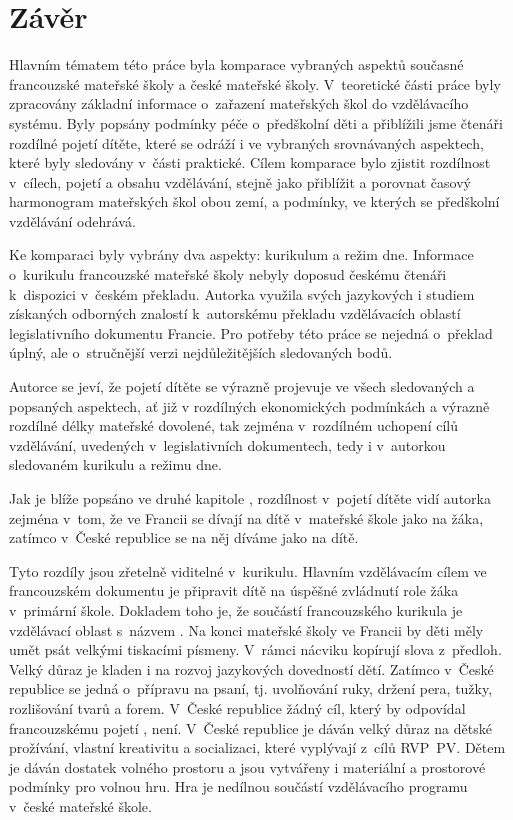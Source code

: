 \chapter*{Závěr}
Hlavním tématem této práce byla komparace vybraných aspektů současné francouzské mateřské školy a české mateřské školy. V~teoretické části práce byly zpracovány základní informace o~zařazení mateřských škol do vzdělávacího systému. Byly popsány podmínky péče o~předškolní děti a přiblížili jsme čtenáři rozdílné pojetí dítěte, které se odráží i ve vybraných srovnávaných aspektech, které byly sledovány v~části praktické. Cílem komparace bylo zjistit rozdílnost v~cílech, pojetí a obsahu vzdělávání, stejně jako přiblížit a porovnat časový harmonogram mateřských škol obou zemí, a podmínky, ve kterých se předškolní vzdělávání odehrává.  

Ke komparaci byly vybrány dva aspekty: kurikulum a režim dne. Informace o~kurikulu francouzské mateřské školy nebyly doposud českému čtenáři k~dispozici v~českém překladu. Autorka využila svých jazykových i studiem získaných odborných znalostí k~autorskému překladu vzdělávacích oblastí legislativního dokumentu Francie. Pro potřeby této práce se nejedná o~překlad úplný, ale o~stručnější verzi nejdůležitějších sledovaných bodů. 

Autorce se jeví, že pojetí dítěte se výrazně projevuje ve všech sledovaných a popsaných aspektech, ať již v rozdílných ekonomických podmínkách a výrazně rozdílné délky mateřské dovolené, tak zejména v~rozdílném uchopení cílů vzdělávání, uvedených v~legislativních dokumentech, tedy i v~autorkou sledovaném kurikulu a režimu dne. 

Jak je blíže popsáno ve druhé kapitole , rozdílnost v~pojetí dítěte vidí autorka zejména v~tom, že ve Francii se dívají na dítě v~mateřské škole jako na žáka, zatímco v~České republice se na něj díváme jako na dítě.   

Tyto rozdíly jsou zřetelně viditelné v~kurikulu. Hlavním vzdělávacím cílem ve francouzském dokumentu je připravit dítě na úspěšné zvládnutí role žáka v~primární škole. Dokladem toho je, že součástí francouzského kurikula je vzdělávací oblast s~názvem . Na konci mateřské školy ve Francii by děti měly umět psát velkými tiskacími písmeny. V~rámci nácviku kopírují slova z~předloh. Velký důraz je kladen i na rozvoj jazykových dovedností dětí. Zatímco v~České republice se jedná o~přípravu na psaní, tj. uvolňování ruky, držení pera, tužky, rozlišování tvarů a forem. V~České republice žádný cíl, který by odpovídal francouzskému pojetí , není. V~České republice je dáván velký důraz na dětské prožívání, vlastní kreativitu a socializaci, které vyplývají z~cílů RVP~PV. Dětem je dáván dostatek volného prostoru a jsou vytvářeny i materiální a prostorové podmínky pro volnou hru. Hra je nedílnou součástí vzdělávacího programu v~české mateřské škole. 

